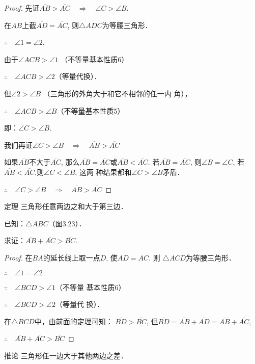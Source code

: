 \begin{proof}
    先证$\overline{AB}>\overline{AC}\quad\Rightarrow\quad \angle C>\angle B$.

在$AB$上截$\overline{AD}=\overline{AC}$,
则$\triangle ADC$为等腰三角形．

$\therefore\quad \angle 1=\angle 2$.

由于$\angle ACB>\angle 1$ （不等量基本性质6）

$\therefore\quad \angle ACB>\angle 2$（等量代换）．

但$\angle 2>\angle B$ （三角形的外角大于和它不相邻的任一内
角），

$\therefore\quad \angle ACB>\angle B$（不等量基本性质5）

即：$\angle C>\angle B$.

我们再证$\angle C>\angle B\quad \Rightarrow\quad \overline{AB}>\overline{AC}$

如果$\overline{AB}$不大于$\overline{AC}$, 那么$\overline{AB}=\overline{AC}$或$\overline{AB}<\overline{AC}$. 
若$\overline{AB}=\overline{AC}$, 则$\angle B=\angle C$, 若$\overline{AB}<\overline{AC}$,则$\angle C<\angle B$, 这两
种结果都和$\angle C>\angle B$矛盾．

$\therefore\quad \angle C>\angle B\quad \Rightarrow\quad \overline{AB}>\overline{AC}$
\end{proof}

\begin{blk}{定理}
    三角形任意两边之和大于第三边．
\end{blk}
 
已知：$\triangle ABC$（图3.23）．

求证：$\overline{AB}+\overline{AC}>\overline{BC}$.

\begin{proof}
    在$BA$的延长线上取一点$D$, 使$AD=AC$. 则
    $\triangle ACD$为等腰三角形．
  
    $\therefore\quad \angle 1=\angle 2$

    $\because\quad \angle BCD>\angle 1$（不等量
    基本性质6）

$\therefore\quad \angle BCD>\angle 2$（等量代
    换）．

    在$\triangle BCD$中，由前面的定理可知：
    $\overline{BD}>\overline{BC}$, 但$\overline{BD}=\overline{AB}+\overline{AD}=\overline{AB}+\overline{AC}$, 
 
   $\therefore\quad  \overline{AB}+\overline{AC}>\overline{BC}$
\end{proof}

\begin{blk}{推论}
三角形任一边大于其他两边之差．
\end{blk}

